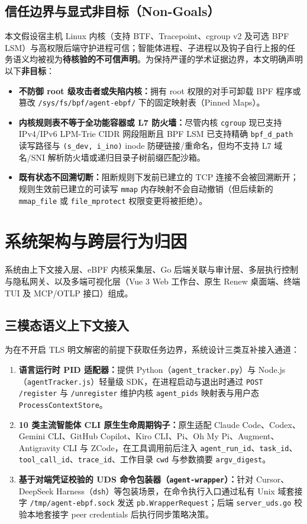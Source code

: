 \documentclass[UTF8,a4paper,zihao=-4,twocolumn]{ctexart}
\newcommand{\code}[1]{\texttt{\small #1}}
\begin{document}
\subsection{信任边界与显式非目标（Non-Goals）}
本文假设宿主机 Linux 内核（支持 BTF、Tracepoint、cgroup v2 及可选 BPF LSM）与高权限后端守护进程可信；智能体进程、子进程以及钩子自行上报的任务语义均被视为\textbf{待核验的不可信声明}。为保持严谨的学术证据边界，本文明确声明以下\textbf{非目标}：
\begin{itemize}
  \item \textbf{不防御 root 级攻击者或失陷内核：}拥有 root 权限的对手可卸载 BPF 程序或篡改 \code{/sys/fs/bpf/agent-ebpf/} 下的固定映射表（Pinned Maps）。
  \item \textbf{内核规则表不等于全功能容器或 L7 防火墙：}尽管内核 \code{cgroup} 现已支持 IPv4/IPv6 LPM-Trie CIDR 网段阻断且 BPF LSM 已支持精确 \code{bpf\_d\_path} 读写路径与 \code{(s\_dev, i\_ino)} inode 防硬链接/重命名，但均不支持 L7 域名/SNI 解析防火墙或递归目录子树前缀匹配沙箱。
  \item \textbf{既有状态不回溯切断：}阻断规则下发前已建立的 TCP 连接不会被回溯断开；规则生效前已建立的可读写 \code{mmap} 内存映射不会自动撤销（但后续新的 \code{mmap\_file} 或 \code{file\_mprotect} 权限变更将被拒绝）。
\end{itemize}

\section{系统架构与跨层行为归因}
\label{sec:arch}

系统由上下文接入层、eBPF 内核采集层、Go 后端关联与审计层、多层执行控制与隐私网关、以及多端可视化层（Vue 3 Web 工作台、原生 Renew 桌面端、终端 TUI 及 MCP/OTLP 接口）组成。

\subsection{三模态语义上下文接入}
为在不开启 TLS 明文解密的前提下获取任务边界，系统设计三类互补接入通道：
\begin{enumerate}
  \item \textbf{语言运行时 PID 适配器：}提供 Python（\code{agent\_tracker.py}）与 Node.js（\code{agentTracker.js}）轻量级 SDK，在进程启动与退出时通过 \code{POST /register} 与 \code{/unregister} 维护内核 \code{agent\_pids} 映射表与用户态 \code{ProcessContextStore}。
  \item \textbf{10 类主流智能体 CLI 原生生命周期钩子：}原生适配 Claude Code、Codex、Gemini CLI、GitHub Copilot、Kiro CLI、Pi、Oh My Pi、Augment、Antigravity CLI 与 ZCode，在工具调用前后注入 \code{agent\_run\_id}、\code{task\_id}、\code{tool\_call\_id}、\code{trace\_id}、工作目录 \code{cwd} 与参数摘要 \code{argv\_digest}。
  \item \textbf{基于对端凭证校验的 UDS 命令包装器（\code{agent-wrapper}）：}针对 Cursor、DeepSeek Harness（\code{dsh}）等包装场景，在命令执行入口通过私有 Unix 域套接字 \code{/tmp/agent-ebpf.sock} 发送 \code{pb.WrapperRequest}；后端 \code{server\_uds.go} 校验本地套接字 peer credentials 后执行同步策略决策。
\end{enumerate}
\end{document}
